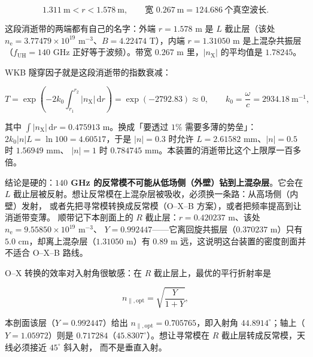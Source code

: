 \begin{equation}
1.311\ \mathrm{m}<r<1.578\ \mathrm{m},\qquad
\text{宽 }0.267\ \mathrm{m}=124.686\ \text{个真空波长}.
\label{eq:app-at-evan}
\end{equation}

这段消逝带的两端都有自己的名字：外端 $r=1.578$ m 是 $L$ 截止层（该处 $n_\mathrm{e}
=3.77479\times10^{19}$ m$^{-3}$、$B=4.22474$ T），内端 $r=1.31050$ m 是上混杂共振层
（$f_\mathrm{UH}=140$ GHz 正好等于波频）。带宽 $0.267$ m 里，$|n_\mathrm{X}|$ 的平均值是
$1.78245$。

WKB 隧穿因子就是这段消逝带的指数衰减：

\begin{equation}
T=\exp\!\left(-2k_0\int_{r_1}^{r_2}|n_\mathrm{X}|\,\mathrm{d}r\right)
=\exp(-2792.83)\approx 0 ,
\qquad k_0=\frac{\omega}{c}=2934.18\ \mathrm{m^{-1}} ,
\label{eq:app-at-tunnel}
\end{equation}

其中 $\int|n_\mathrm{X}|\,\mathrm{d}r=0.475913$ m。换成「要透过 $1\%$ 需要多薄的势垒」：
$2k_0|n|L=\ln 100=4.60517$，于是 $|n|=0.3$ 时允许 $L=2.61582$ mm、$|n|=0.5$ 时 $1.56949$ mm、
$|n|=1$ 时 $0.784745$ mm。本装置的消逝带比这个上限厚一百多倍。

结论是硬的：\textbf{$140$ GHz 的反常模不可能从低场侧（外壁）钻到上混杂层}。它会在
$L$ 截止层被反射。想让反常模在上混杂层被吸收，必须换一条路：从高场侧（内壁）发射，
或者先把寻常模转换成反常模（O--X--B 方案），或者把频率提高到让消逝带变薄。
顺带记下本剖面上的 $R$ 截止层：$r=0.420237$ m、该处 $n_\mathrm{e}=9.55850\times10^{19}$ m$^{-3}$、
$Y=0.992447$——它离回旋共振层（$0.370237$ m）只有 $5.0$ cm，却离上混杂层（$1.31050$ m）有
$0.89$ m 远，这说明这台装置的密度剖面并不适合 O--X--B 路线。

O--X 转换的效率对入射角很敏感：在 $R$ 截止层上，最优的平行折射率是

\begin{equation}
n_{\parallel,\mathrm{opt}}=\sqrt{\frac{Y}{1+Y}} ,
\label{eq:app-at-ox}
\end{equation}

本剖面该层（$Y=0.992447$）给出 $n_{\parallel,\mathrm{opt}}=0.705765$，即入射角
$44.8914^\circ$；轴上（$Y=1.05972$）则是 $0.717284$（$45.8307^\circ$）。想让寻常模在 $R$ 截止层转成反常模，天线必须接近 $45^\circ$ 斜入射，
而不是垂直入射。

